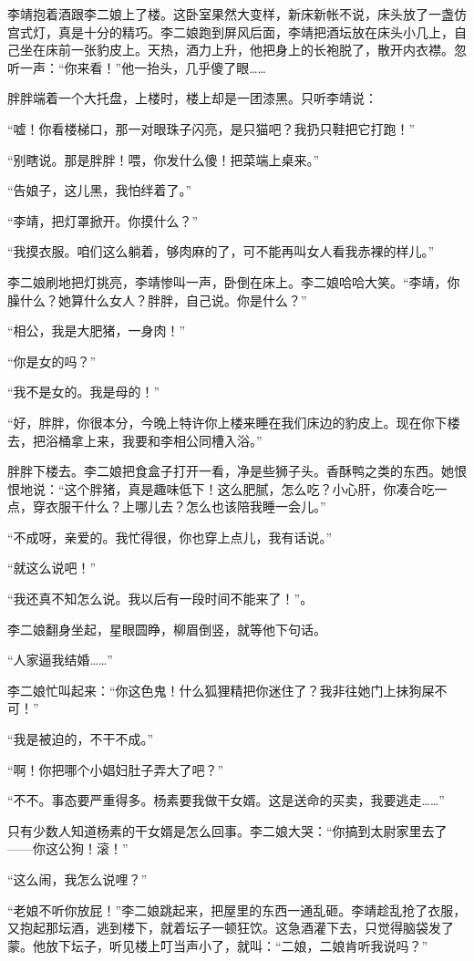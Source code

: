 李靖抱着酒跟李二娘上了楼。这卧室果然大变样，新床新帐不说，床头放了一盏仿宫式灯，真是十分的精巧。李二娘跑到屏风后面，李靖把酒坛放在床头小几上，自己坐在床前一张豹皮上。天热，酒力上升，他把身上的长袍脱了，散开内衣襟。忽听一声：“你来看！”他一抬头，几乎傻了眼……

胖胖端着一个大托盘，上楼时，楼上却是一团漆黑。只听李靖说：

“嘘！你看楼梯口，那一对眼珠子闪亮，是只猫吧？我扔只鞋把它打跑！”

“别瞎说。那是胖胖！喂，你发什么傻！把菜端上桌来。”

“告娘子，这儿黑，我怕绊着了。”

“李靖，把灯罩掀开。你摸什么？”

“我摸衣服。咱们这么躺着，够肉麻的了，可不能再叫女人看我赤裸的样儿。”

李二娘刷地把灯挑亮，李靖惨叫一声，卧倒在床上。李二娘哈哈大笑。“李靖，你臊什么？她算什么女人？胖胖，自己说。你是什么？”

“相公，我是大肥猪，一身肉！”

“你是女的吗？”

“我不是女的。我是母的！”

“好，胖胖，你很本分，今晚上特许你上楼来睡在我们床边的豹皮上。现在你下楼去，把浴桶拿上来，我要和李相公同槽入浴。”

胖胖下楼去。李二娘把食盒子打开一看，净是些狮子头。香酥鸭之类的东西。她恨恨地说：“这个胖猪，真是趣味低下！这么肥腻，怎么吃？小心肝，你凑合吃一点，穿衣服干什么？上哪儿去？怎么也该陪我睡一会儿。”

“不成呀，亲爱的。我忙得很，你也穿上点儿，我有话说。”

“就这么说吧！”

“我还真不知怎么说。我以后有一段时间不能来了！”。

李二娘翻身坐起，星眼圆睁，柳眉倒竖，就等他下句话。

“人家逼我结婚……”

李二娘忙叫起来：“你这色鬼！什么狐狸精把你迷住了？我非往她门上抹狗屎不可！”

“我是被迫的，不干不成。”

“啊！你把哪个小娼妇肚子弄大了吧？”

“不不。事态要严重得多。杨素要我做干女婿。这是送命的买卖，我要逃走……”

只有少数人知道杨素的干女婿是怎么回事。李二娘大哭：“你搞到太尉家里去了——你这公狗！滚！”

“这么闹，我怎么说哩？”

“老娘不听你放屁！”李二娘跳起来，把屋里的东西一通乱砸。李靖趁乱抢了衣服，又抱起那坛酒，逃到楼下，就着坛子一顿狂饮。这急酒灌下去，只觉得脑袋发了蒙。他放下坛子，听见楼上叮当声小了，就叫：“二娘，二娘肯听我说吗？”

